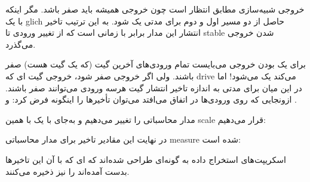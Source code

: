 
خروجی شبیه‌سازی مطابق انتظار است چون خروجی همیشه باید صفر باشد. مگر اینکه با یک glich حاصل از دو مسیر اول و دوم برای مدتی یک شود.
به این ترتیب تاخیر انتشار این مدار برابر با زمانی است که از تغییر ورودی تا stable شدن خروجی می‌گذرد.


برای یک بودن خروجی می‌بایست تمام ورودی‌های آخرین گیت (که یک گیت  هست) صفر باشند.
ولی اگر خروجی  صفر شود، خروجی گیت ای که drive می‌کند یک می‌شود!
اما در این میان برای مدتی به اندازه تاخیر انتشار گیت  هرسه ورودی می‌توانند صفر باشند.
ازونجایی که  روی ورودی‌ها در  اتفاق می‌افتد می‌توان تأخیرها را اینگونه فرض کرد:  و .

\newpage
مدار محاسباتی را تغییر می‌دهیم و به‌جای  با  یک  با همین scale قرار می‌دهیم:



در نهایت این مقادیر تاخیر برای مدار محاسباتی measure شده است:


اسکریپت‌های استخراج داده به گونه‌ای طراحی شده‌اند که ای که با آن این تاخیر‌ها بدست آمده‌اند را نیز ذخیره می‌کنند.

